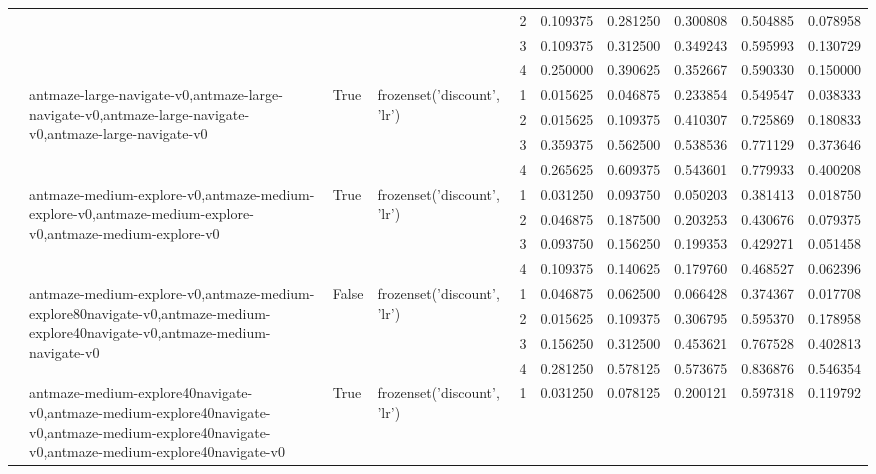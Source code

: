 \begin{tabular}{lllllrrrrr}
 &  &  &  & 2 & 0.109375 & 0.281250 & 0.300808 & 0.504885 & 0.078958 \\
 &  &  &  & 3 & 0.109375 & 0.312500 & 0.349243 & 0.595993 & 0.130729 \\
 &  &  &  & 4 & 0.250000 & 0.390625 & 0.352667 & 0.590330 & 0.150000 \\
\cline{2-10} \cline{3-10} \cline{4-10}
 & \multirow[t]{4}{*}{antmaze-large-navigate-v0,antmaze-large-navigate-v0,antmaze-large-navigate-v0,antmaze-large-navigate-v0} & \multirow[t]{4}{*}{True} & \multirow[t]{4}{*}{frozenset({'discount', 'lr'})} & 1 & 0.015625 & 0.046875 & 0.233854 & 0.549547 & 0.038333 \\
 &  &  &  & 2 & 0.015625 & 0.109375 & 0.410307 & 0.725869 & 0.180833 \\
 &  &  &  & 3 & 0.359375 & 0.562500 & 0.538536 & 0.771129 & 0.373646 \\
 &  &  &  & 4 & 0.265625 & 0.609375 & 0.543601 & 0.779933 & 0.400208 \\
\cline{2-10} \cline{3-10} \cline{4-10}
 & \multirow[t]{4}{*}{antmaze-medium-explore-v0,antmaze-medium-explore-v0,antmaze-medium-explore-v0,antmaze-medium-explore-v0} & \multirow[t]{4}{*}{True} & \multirow[t]{4}{*}{frozenset({'discount', 'lr'})} & 1 & 0.031250 & 0.093750 & 0.050203 & 0.381413 & 0.018750 \\
 &  &  &  & 2 & 0.046875 & 0.187500 & 0.203253 & 0.430676 & 0.079375 \\
 &  &  &  & 3 & 0.093750 & 0.156250 & 0.199353 & 0.429271 & 0.051458 \\
 &  &  &  & 4 & 0.109375 & 0.140625 & 0.179760 & 0.468527 & 0.062396 \\
\cline{2-10} \cline{3-10} \cline{4-10}
 & \multirow[t]{4}{*}{antmaze-medium-explore-v0,antmaze-medium-explore80navigate-v0,antmaze-medium-explore40navigate-v0,antmaze-medium-navigate-v0} & \multirow[t]{4}{*}{False} & \multirow[t]{4}{*}{frozenset({'discount', 'lr'})} & 1 & 0.046875 & 0.062500 & 0.066428 & 0.374367 & 0.017708 \\
 &  &  &  & 2 & 0.015625 & 0.109375 & 0.306795 & 0.595370 & 0.178958 \\
 &  &  &  & 3 & 0.156250 & 0.312500 & 0.453621 & 0.767528 & 0.402813 \\
 &  &  &  & 4 & 0.281250 & 0.578125 & 0.573675 & 0.836876 & 0.546354 \\
\cline{2-10} \cline{3-10} \cline{4-10}
 & \multirow[t]{4}{*}{antmaze-medium-explore40navigate-v0,antmaze-medium-explore40navigate-v0,antmaze-medium-explore40navigate-v0,antmaze-medium-explore40navigate-v0} & \multirow[t]{4}{*}{True} & \multirow[t]{4}{*}{frozenset({'discount', 'lr'})} & 1 & 0.031250 & 0.078125 & 0.200121 & 0.597318 & 0.119792 \\

\end{tabular}
